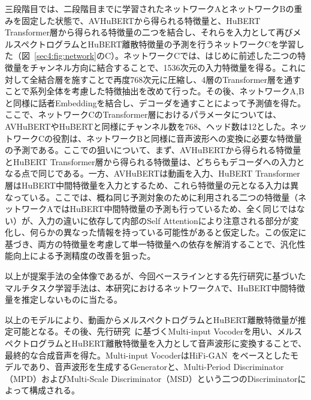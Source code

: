\documentclass[12pt]{jarticle}
\numberwithin{equation}{section}    %
\numberwithin{figure}{section}      %
\numberwithin{table}{section}      %
\begin{document}
三段階目では、二段階目までに学習されたネットワークAとネットワークBの重みを固定した状態で、AVHuBERTから得られる特徴量と、HuBERT Transformer層から得られる特徴量の二つを結合し、それらを入力として再びメルスペクトログラムとHuBERT離散特徴量の予測を行うネットワークCを学習した（図~\ref{sec4:fig:network}のC）。ネットワークCでは、はじめに前述した二つの特徴量をチャンネル方向に結合することで、1536次元の入力特徴量を得る。これに対して全結合層を施すことで再度768次元に圧縮し、4層のTransformer層を通すことで系列全体を考慮した特徴抽出を改めて行った。その後、ネットワークA,Bと同様に話者Embeddingを結合し、デコーダを通すことによって予測値を得た。ここで、ネットワークCのTransformer層におけるパラメータについては、AVHuBERTやHuBERTと同様にチャンネル数を768、ヘッド数は12とした。ネットワークCの役割は、ネットワークBと同様に音声波形への変換に必要な特徴量の予測である。ここでの狙いについて、まず、AVHuBERTから得られる特徴量とHuBERT Transformer層から得られる特徴量は、どちらもデコーダへの入力となる点で同じである。一方、AVHuBERTは動画を入力、HuBERT Transformer層はHuBERT中間特徴量を入力とするため、これら特徴量の元となる入力は異なっている。ここでは、概ね同じ予測対象のために利用される二つの特徴量（ネットワークAではHuBERT中間特徴量の予測も行っているため、全く同じではない）が、入力の違いに依存して内部のSelf Attentionにより注意される部分が変化し、何らかの異なった情報を持っている可能性があると仮定した。この仮定に基づき、両方の特徴量を考慮して単一特徴量への依存を解消することで、汎化性能向上による予測精度の改善を狙った。

以上が提案手法の全体像であるが、今回ベースラインとする先行研究\cite{choi2023intelligible}に基づいたマルチタスク学習手法は、本研究におけるネットワークAで、HuBERT中間特徴量を推定しないものに当たる。

以上のモデルにより、動画からメルスペクトログラムとHuBERT離散特徴量が推定可能となる。その後、先行研究~\cite{choi2023intelligible}に基づくMulti-input Vocoderを用い、メルスペクトログラムとHuBERT離散特徴量を入力として音声波形に変換することで、最終的な合成音声を得た。Multi-input VocoderはHiFi-GAN~\cite{kong2020hifi}をベースとしたモデルであり、音声波形を生成するGeneratorと、Multi-Period Discriminator（MPD）およびMulti-Scale Discriminator（MSD）という二つのDiscriminatorによって構成される。
\end{document}
